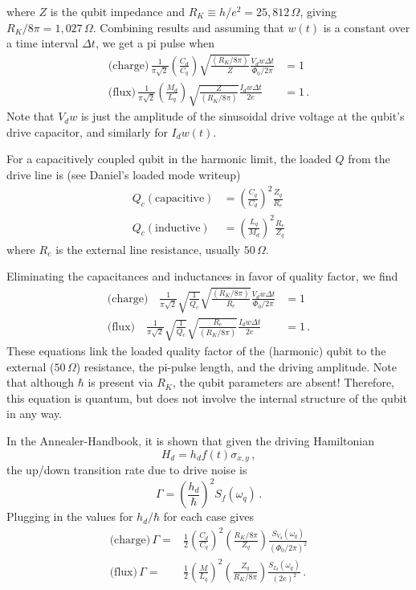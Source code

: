 where $Z$ is the qubit impedance and $R_K \equiv h/e^2 = 25,812 \, \Omega$, giving $R_K/8\pi = 1,027 \, \Omega$.
Combining results and assuming that $w(t)$ is a constant over a time interval $\Delta t$,  we get a pi pulse when
\begin{align*}
  \text{(charge)} \, \frac{1}{\pi\sqrt{2}} \left( \frac{C_d}{C_q} \right) \sqrt{\frac{(R_K/8\pi)}{Z}} \frac{V_d w \Delta t}{\Phi_0/2\pi} &= 1 \\
  \text{(flux)} \, \frac{1}{\pi\sqrt{2}} \left( \frac{M_d}{L_q} \right) \sqrt{\frac{Z}{(R_K/8\pi)}} \frac{I_d w \Delta t}{2e} &= 1 \, .
\end{align*}
Note that $V_d w$ is just the amplitude of the sinusoidal drive voltage at the qubit's drive capacitor, and similarly for $I_d w(t)$.


For a capacitively coupled qubit in the harmonic limit, the loaded $Q$ from the drive line is (see Daniel's loaded mode writeup)
\begin{align*}
  Q_c (\text{capacitive}) &= \left( \frac{C_q}{C_d} \right)^2 \frac{Z_q}{R_e} \\
  Q_c (\text{inductive}) &= \left( \frac{L_q}{M_d} \right)^2 \frac{R_e}{Z_q}
\end{align*}
where $R_e$ is the external line resistance, usually $50 \, \Omega$.

Eliminating the capacitances and inductances in favor of quality factor, we find
\begin{align*}
  \text{(charge)} \quad
    \frac{1}{\pi\sqrt{2}} \sqrt{\frac{1}{Q_c}}
    \sqrt{\frac{(R_K/8\pi)}{R_e}} \frac{V_d w \Delta t}{\Phi_0/2\pi} &= 1 \\
  \text{(flux)} \quad
    \frac{1}{\pi\sqrt{2}} \sqrt{\frac{1}{Q_c}}
    \sqrt{\frac{R_e}{(R_K/8\pi)}} \frac{I_d w \Delta t}{2e} &= 1 \, .
\end{align*}
These equations link the loaded quality factor of the (harmonic) qubit to the external ($50 \, \Omega$) resistance, the pi-pulse length, and the driving amplitude.
Note that although $\hbar$ is present via $R_K$, the qubit parameters are absent!
Therefore, this equation is quantum, but does not involve the internal structure of the qubit in any way.

In the Annealer-Handbook, it is shown that given the driving Hamiltonian
\begin{displaymath}
  H_d = h_d f(t) \sigma_{x,y} \, ,
\end{displaymath}
the up/down transition rate due to drive noise is
\begin{equation*}
  \Gamma = \left( \frac{h_d}{\hbar} \right)^2 S_f(\omega_q) \, .
\end{equation*}
Plugging in the values for $h_d/\hbar$ for each case gives
\begin{align*}
  \text{(charge)} \, \Gamma =&
    \frac{1}{2} \left( \frac{C_d}{C_q} \right)^2
    \left( \frac{R_K/8\pi}{Z_q} \right) \frac{S_{V_d}(\omega_q)}{(\Phi_0/2\pi)^2} \\
  \text{(flux)} \, \Gamma =&
    \frac{1}{2} \left( \frac{M}{L_q} \right)^2
    \left( \frac{Z_q}{R_K/8\pi} \right) \frac{S_{I_d}(\omega_q)}{(2e)^2} \, .
\end{align*}

